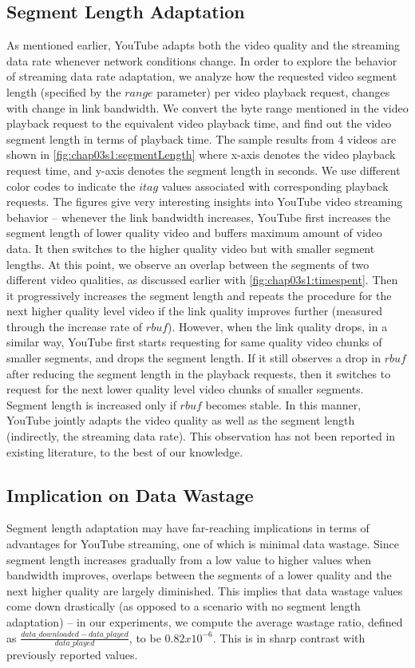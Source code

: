 \subsection{Segment Length Adaptation}
As mentioned earlier, YouTube adapts both the video quality and the streaming data rate whenever network conditions change.
In order to explore the behavior of streaming data rate adaptation, we analyze how the requested video segment length (specified by the $range$ parameter) per video playback request, changes with change in link bandwidth.
We convert the byte range mentioned in the video playback request to the equivalent video playback time, and find out the video segment length in terms of playback time.
The sample results from $4$ videos are shown in \fig\ref{fig:chap03s1:segmentLength} where x-axis denotes the video playback request time, and y-axis denotes the segment length in seconds.
We use different color codes to indicate the $itag$ values associated with corresponding playback requests.
The figures give very interesting insights into YouTube video streaming behavior -- whenever the link bandwidth increases, YouTube first increases the segment length of lower quality video and buffers maximum amount of video data.
It then switches to the higher quality video but with smaller segment lengths.
At this point, we observe an overlap between the segments of two different video qualities, as discussed earlier with \fig\ref{fig:chap03s1:timespent}.
Then it progressively increases the segment length and repeats the procedure for the next higher quality level video if the link quality improves further (measured through the increase rate of $rbuf$).
However, when the link quality drops, in a similar way, YouTube first starts requesting for same quality video chunks of smaller segments, and drops the segment length.
If it still observes a drop in $rbuf$ after reducing the segment length in the playback requests, then it switches to request for the next lower quality level video chunks of smaller segments.
Segment length is increased only if $rbuf$ becomes stable.
In this manner, YouTube jointly adapts the video quality as well as the segment length (indirectly, the streaming data rate).
This observation has not been reported in existing literature, to the best of our knowledge.

\subsection{Implication on Data Wastage}
Segment length adaptation may have far-reaching implications in terms of advantages for YouTube streaming, one of which is minimal data wastage.
Since segment length increases gradually from a low value to higher values when bandwidth improves, overlaps between the segments of a lower quality and the next higher quality are largely diminished.
This implies that data wastage values come down drastically (as opposed to a scenario with no segment length adaptation) -- in our experiments, we compute the average wastage ratio, defined as $\frac{data\_downloaded - data\_played}{data\_played}$, to be $0.82 x 10^{-6}$.
This is in sharp contrast with previously reported values.

